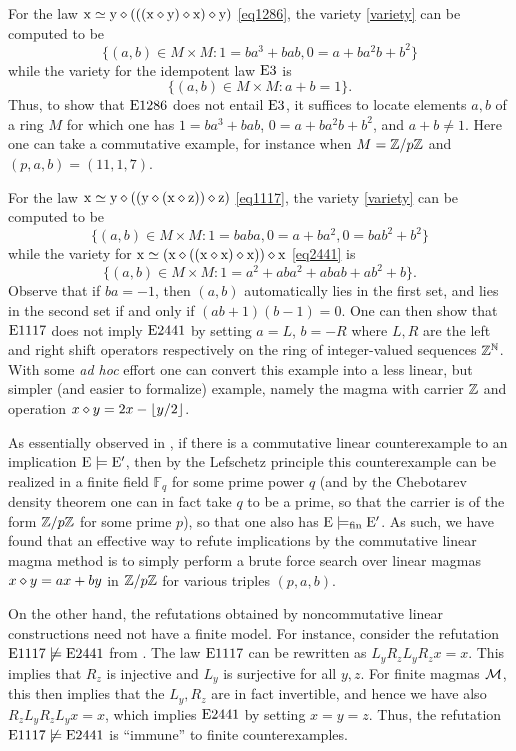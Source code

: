 \begin{example}\label{1286-ex} For the law $\mathrm{x} \simeq \mathrm{y} \diamond (((\mathrm{x} \diamond \mathrm{y}) \diamond \mathrm{x}) \diamond \mathrm{y})$ \eqref{eq1286}, the variety \eqref{variety} can be computed to be
$$ \{ (a,b) \in M \times M: 1 = ba^3+bab, 0 = a + ba^2 b + b^2 \}$$
while the variety for the idempotent law $\mathrm{E}3$ is
$$ \{ (a,b) \in M \times M: a+b=1 \}.$$
Thus, to show that $\mathrm{E}1286$ does not entail $\mathrm{E}3$, it suffices to locate elements $a,b$ of a ring $M$ for which one has $1 = ba^3+bab$, $0 = a + ba^2 b + b^2$, and $a+b \neq 1$.  Here one can take a commutative example, for instance when $M = \mathbb{Z}/p\mathbb{Z}$ and $(p,a,b) = (11,1,7)$.
\end{example}

\begin{example}\label{1117-ex} For the law $\mathrm{x} \simeq \mathrm{y} \diamond ((\mathrm{y} \diamond (\mathrm{x} \diamond \mathrm{z})) \diamond \mathrm{z})$ \eqref{eq1117}, the variety \eqref{variety} can be computed to be
$$ \{ (a,b) \in M \times M: 1 = baba, 0 = a+ba^2, 0 = bab^2 + b^2 \}$$
while the variety for $\mathrm{x} \simeq (\mathrm{x} \diamond ((\mathrm{x} \diamond \mathrm{x}) \diamond \mathrm{x})) \diamond \mathrm{x}$ \eqref{eq2441} is
$$ \{ (a,b) \in M \times M: 1 = a^2 + aba^2 + abab + ab^2 + b \}.$$
Observe that if $ba = -1$, then $(a,b)$ automatically lies in the first set, and lies in the second set if and only if $(ab+1)(b-1) = 0$.  One can then show that $\mathrm{E}1117$ does not imply $\mathrm{E}2441$ by setting $a = L$, $b = -R$ where $L, R$ are the left and right shift operators respectively on the ring of integer-valued sequences $\mathbb{Z}^{\mathbb{N}}$.  With some \emph{ad hoc} effort one can convert this example into a less linear, but simpler (and easier to formalize) example, namely the magma with carrier $\mathbb{Z}$ and operation $x \diamond y = 2x - \lfloor y/2 \rfloor$.
\end{example}

\begin{remark} As essentially observed in \cite{austin}, if there is a commutative linear counterexample to an implication $\mathrm{E} \models {\mathrm{E}'}$, then by the Lefschetz principle this counterexample can be realized in a finite field ${\mathbb F}_q$ for some prime power $q$ (and by the Chebotarev density theorem one can in fact take $q$ to be a prime, so that the carrier is of the form $\mathbb{Z}/p\mathbb{Z}$ for some prime $p$), so that one also has $\mathrm{E} \models_{\mathrm{fin}} {\mathrm{E}'}$.  As such, we have found that an effective way to refute implications by the commutative linear magma method is to simply perform a brute force search over linear magmas $x \diamond y = ax + by$ in $\mathbb{Z}/p\mathbb{Z}$ for various triples $(p,a,b)$.

On the other hand, the refutations obtained by noncommutative linear constructions need not have a finite model.  For instance, consider the refutation $\mathrm{E}1117 \not\models \mathrm{E}2441$ from .  The law $\mathrm{E}1117$ can be rewritten as $L_y R_z L_y R_z x = x$.  This implies that $R_z$ is injective and $L_y$ is surjective for all $y,z$.  For finite magmas ${\mathcal{M}}$, this then implies that the $L_y, R_z$ are in fact invertible, and hence we have also $R_z L_y R_z L_y x = x$, which implies $\mathrm{E}2441$ by setting $x=y=z$.  Thus, the refutation $\mathrm{E}1117 \not\models \mathrm{E}2441$ is ``immune'' to finite counterexamples.
\end{remark}

